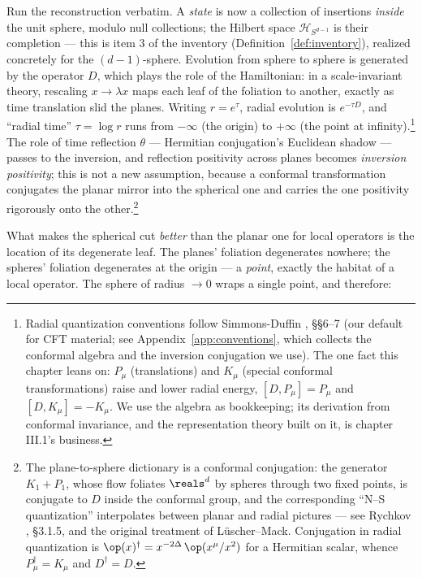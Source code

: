 Run the reconstruction verbatim. A \emph{state} is now a collection of
insertions \emph{inside} the unit sphere, modulo null collections; the Hilbert
space $\mathcal{H}_{S^{d-1}}$ is their completion --- this is item 3 of the
inventory (Definition~\ref{def:inventory}), realized concretely for the
$(d-1)$-sphere. Evolution from sphere to sphere is generated by the
 operator $D$, which plays the role of the Hamiltonian: in a
scale-invariant theory, rescaling $x \to \lambda x$ maps each leaf of the
foliation to another, exactly as time translation slid the planes. Writing $r
= e^{\tau}$, radial evolution is $e^{-\tau D}$, and ``radial time'' $\tau =
\log r$ runs from $-\infty$ (the origin) to $+\infty$ (the point at
infinity).\footnote{Radial quantization conventions follow Simmons-Duffin
, \S\S6--7 (our default for CFT material; see
Appendix~\ref{app:conventions}, which collects the conformal algebra and the
inversion conjugation we use). The one fact this chapter leans on: $P_\mu$
(translations) and $K_\mu$ (special conformal transformations) raise and lower
radial energy, $[D, P_\mu] = P_\mu$ and $[D, K_\mu] = -K_\mu$. We use the
algebra as bookkeeping; its derivation from conformal invariance, and the
representation theory built on it, is chapter III.1's business.} The role
of time reflection $\theta$ --- Hermitian conjugation's Euclidean shadow ---
passes to the inversion, and reflection positivity across planes becomes
\emph{inversion positivity}; this is not a new assumption, because a
conformal transformation conjugates the planar mirror into the spherical one
and carries the one positivity rigorously onto the
other.\footnote{The plane-to-sphere dictionary is a
conformal conjugation: the generator $K_1 + P_1$, whose flow foliates
$\reals^d$ by spheres through two fixed points, is conjugate to $D$ inside the
conformal group, and the corresponding ``N--S quantization'' interpolates
between planar and radial pictures --- see Rychkov ,
\S3.1.5, and the original treatment of L\"uscher--Mack. Conjugation in radial
quantization is $\op(x)^\dagger = x^{-2\Delta}\,\op(x^\mu/x^2)$ for a
Hermitian scalar, whence $P_\mu^\dagger = K_\mu$ and $D^\dagger = D$.}

What makes the spherical cut \emph{better} than the planar one for local
operators is the location of its degenerate leaf. The planes' foliation
degenerates nowhere; the spheres' foliation degenerates at the origin --- a
\emph{point}, exactly the habitat of a local operator. The sphere of radius
$\to 0$ wraps a single point, and therefore:

